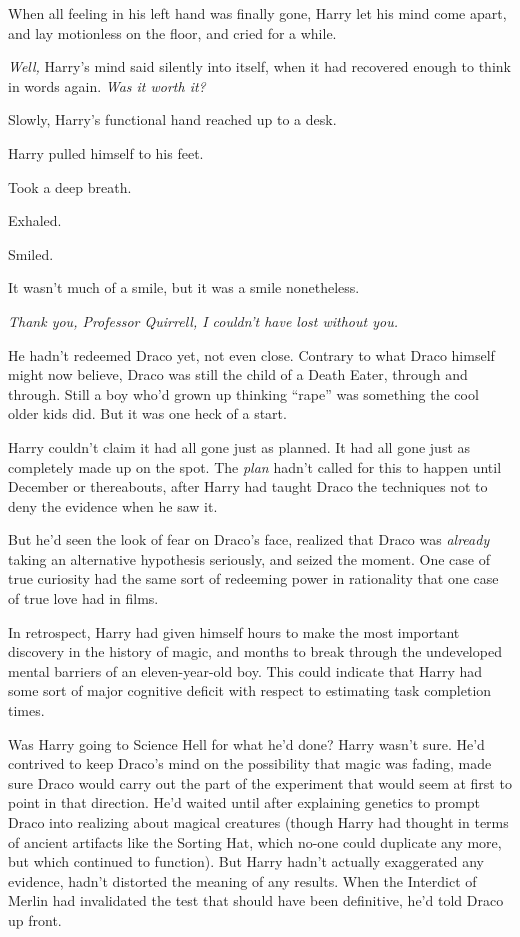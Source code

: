 When all feeling in his left hand was finally gone, Harry let his mind come apart, and lay motionless on the floor, and cried for a while.

\emph{Well,} Harry’s mind said silently into itself, when it had recovered enough to think in words again. \emph{Was it worth it?}

Slowly, Harry’s functional hand reached up to a desk.

Harry pulled himself to his feet.

Took a deep breath.

Exhaled.

Smiled.

It wasn’t much of a smile, but it was a smile nonetheless.

\emph{Thank you, Professor Quirrell, I couldn’t have lost without you.}

He hadn’t redeemed Draco yet, not even close. Contrary to what Draco himself might now believe, Draco was still the child of a Death Eater, through and through. Still a boy who’d grown up thinking “rape” was something the cool older kids did. But it was one heck of a start.

Harry couldn’t claim it had all gone just as planned. It had all gone just as completely made up on the spot. The \emph{plan} hadn’t called for this to happen until December or thereabouts, after Harry had taught Draco the techniques not to deny the evidence when he saw it.

But he’d seen the look of fear on Draco’s face, realized that Draco was \emph{already} taking an alternative hypothesis seriously, and seized the moment. One case of true curiosity had the same sort of redeeming power in rationality that one case of true love had in films.

In retrospect, Harry had given himself hours to make the most important discovery in the history of magic, and months to break through the undeveloped mental barriers of an eleven-year-old boy. This could indicate that Harry had some sort of major cognitive deficit with respect to estimating task completion times.

Was Harry going to Science Hell for what he’d done? Harry wasn’t sure. He’d contrived to keep Draco’s mind on the possibility that magic was fading, made sure Draco would carry out the part of the experiment that would seem at first to point in that direction. He’d waited until after explaining genetics to prompt Draco into realizing about magical creatures (though Harry had thought in terms of ancient artifacts like the Sorting Hat, which no-one could duplicate any more, but which continued to function). But Harry hadn’t actually exaggerated any evidence, hadn’t distorted the meaning of any results. When the Interdict of Merlin had invalidated the test that should have been definitive, he’d told Draco up front.

